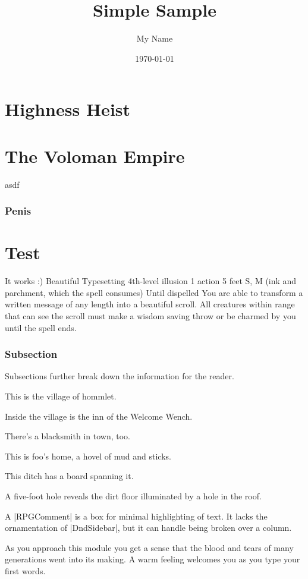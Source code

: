 \documentclass[letterpaper,twocolumn,openany]{memoir}
\title{Simple Sample} %
\author{My Name} %
\date{\today} %
\begin{document}
\tableofcontents

\chapter{Highness Heist}

\lipsum


\chapter{The Voloman Empire}

asdf

\subsection{Penis}
\lipsum

\chapter{Test}
It works :)
\RPGSpellHeader
	{Beautiful Typesetting}
	{4th-level illusion}
	{1 action}
	{5 feet}
	{S, M (ink and parchment, which the spell consumes)}
	{Until dispelled}
You are able to transform a written message of any length into a beautiful scroll. All creatures within range that can see the scroll must make a wisdom saving throw or be charmed by you until the spell ends.

\subsection{Subsection}
Subsections further break down the information for the reader.

 \label{hommlet-village}
This is the village of hommlet.

Inside the village is the inn of the Welcome Wench.

There's a blacksmith in town, too.

This is foo's home, a hovel of mud and sticks.

This ditch has a board spanning it.

A five-foot hole reveals the dirt floor illuminated by a hole in the roof.

\begin{RPGComment}
	A |RPGComment| is a box for minimal highlighting of text. It lacks the ornamentation of |DndSidebar|, but it can handle being broken over a column.
\end{RPGComment}

\begin{RPGReadAloud}
	As you approach this module you get a sense that the blood and tears of many generations went into its making. A warm feeling welcomes you as you type your first words.
\end{RPGReadAloud}
\end{document}
